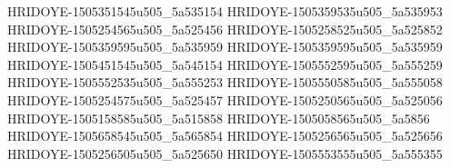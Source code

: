 HRIDOYE-1505351545u505_5a535154
HRIDOYE-1505359535u505_5a535953
HRIDOYE-1505254565u505_5a525456
HRIDOYE-1505258525u505_5a525852
HRIDOYE-1505359595u505_5a535959
HRIDOYE-1505359595u505_5a535959
HRIDOYE-1505451545u505_5a545154
HRIDOYE-1505552595u505_5a555259
HRIDOYE-1505552535u505_5a555253
HRIDOYE-1505550585u505_5a555058
HRIDOYE-1505254575u505_5a525457
HRIDOYE-1505250565u505_5a525056
HRIDOYE-1505158585u505_5a515858
HRIDOYE-1505058565u505_5a5856
HRIDOYE-1505658545u505_5a565854
HRIDOYE-1505256565u505_5a525656
HRIDOYE-1505256505u505_5a525650
HRIDOYE-1505553555u505_5a555355
